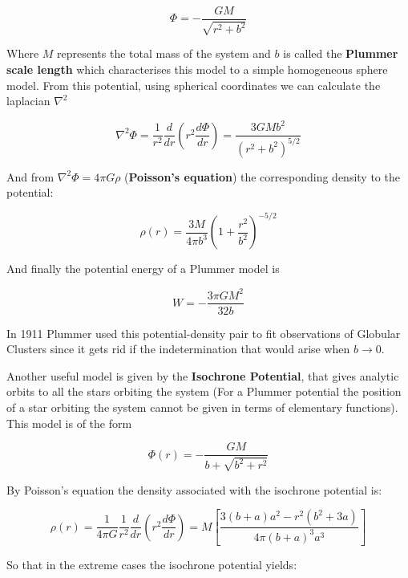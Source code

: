 \begin{equation}
\Phi=-\frac{GM}{\sqrt{r^{2}+b^{2}}}
\end{equation}

Where $M$ represents the total mass of the system and $b$ is called the \textbf{Plummer scale length} which characterises this model to a simple homogeneous sphere model. From this potential, using spherical coordinates we can calculate the laplacian $\nabla^{2}$

\begin{equation}
\nabla^{2}\Phi=\frac{1}{r^{2}}\frac{d}{dr}\left(r^{2}\frac{d\Phi}{dr}\right)=\frac{3GMb^{2}}{\left(r^{2}+b^{2}\right)^{5/2}}
\end{equation}

And from $\nabla^{2}\Phi=4\pi G\rho$ (\textbf{Poisson's equation}) the corresponding density to the potential:

\begin{equation}
\rho(r)=\frac{3M}{4\pi b^{3}}\left(1+\frac{r^{2}}{b^{2}}\right)^{-5/2}
\end{equation}

And finally the potential energy of a Plummer model is

\begin{equation}
W=-\frac{3\pi GM^{2}}{32b}
\end{equation}

In 1911 Plummer used this potential-density pair to fit observations of Globular Clusters since it gets rid if the indetermination that would arise when $b \rightarrow 0$.

Another useful model is given by the \textbf{Isochrone Potential}, that gives analytic orbits to all the stars orbiting the system (For a Plummer potential the position of a star orbiting the system cannot be given in terms of elementary functions). This model is of the form

\begin{equation}
\Phi(r)=-\frac{GM}{b+\sqrt{b^{2}+r^{2}}}
\end{equation}

By Poisson's equation the density associated with the isochrone potential is:

\begin{equation}
\rho(r)=\frac{1}{4\pi G}\frac{1}{r^{2}}\frac{d}{dr}\left(r^{2}\frac{d\Phi}{dr}\right)=M\left[\frac{3\left(b+a\right)a^{2}-r^{2}(b^{2}+3a)}{4\pi(b+a)^{3}a^{3}}\right]
\end{equation}

So that in the extreme cases the isochrone potential yields:

